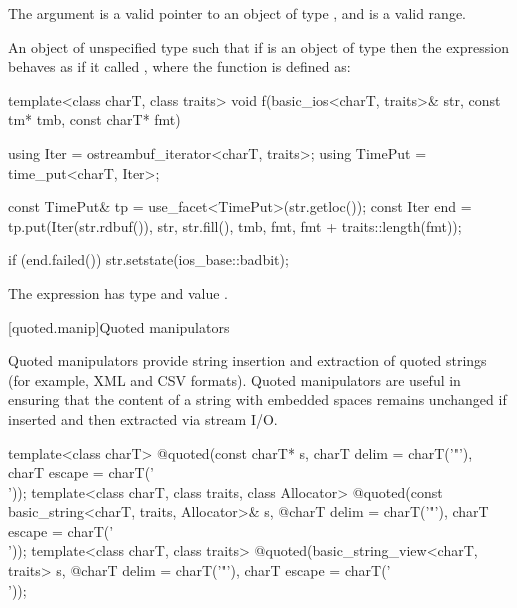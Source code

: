 \begin{itemdescr}
\pnum
\expects
The argument  is a valid pointer to an object of type ,
and  is a valid range.

\pnum
\returns
An object of unspecified type such that if  is an object of
type  then the expression
 behaves as if it called ,
where the function  is defined as:
\begin{codeblock}
template<class charT, class traits>
void f(basic_ios<charT, traits>& str, const tm* tmb, const charT* fmt) {
  using Iter    = ostreambuf_iterator<charT, traits>;
  using TimePut = time_put<charT, Iter>;

  const TimePut& tp = use_facet<TimePut>(str.getloc());
  const Iter end = tp.put(Iter(str.rdbuf()), str, str.fill(), tmb,
    fmt, fmt + traits::length(fmt));

  if (end.failed())
    str.setstate(ios_base::badbit);
}
\end{codeblock}

The expression  has type
 and value .
\end{itemdescr}

[quoted.manip]{Quoted manipulators}

\pnum
\begin{note}
Quoted manipulators provide string insertion and extraction of quoted strings (for example, XML and CSV formats). Quoted manipulators are useful in ensuring that the content of a string with embedded spaces remains unchanged if inserted and then extracted via stream I/O.
\end{note}

%
\begin{itemdecl}
template<class charT>
  @\unspec@ quoted(const charT* s, charT delim = charT('"'), charT escape = charT('\\'));
template<class charT, class traits, class Allocator>
  @\unspec@ quoted(const basic_string<charT, traits, Allocator>& s,
  @\itcorr@                   charT delim = charT('"'), charT escape = charT('\\'));
template<class charT, class traits>
  @\unspec@ quoted(basic_string_view<charT, traits> s,
  @\itcorr@                   charT delim = charT('"'), charT escape = charT('\\'));
\end{itemdecl}

